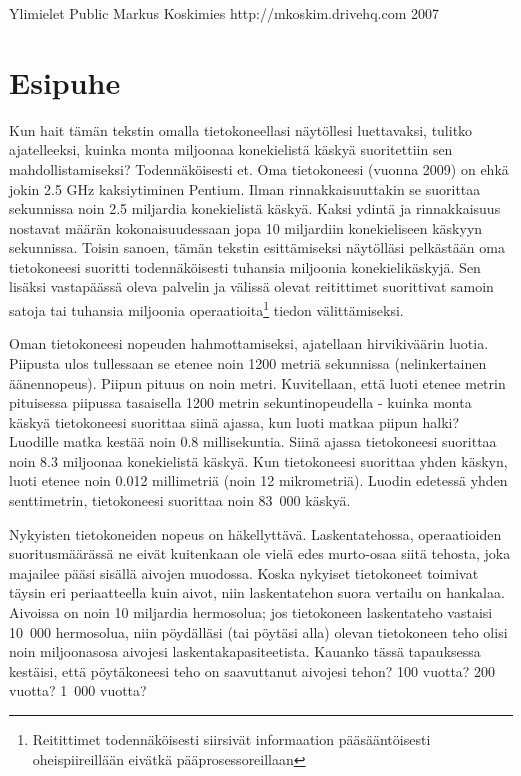 \longstory
{Ylimielet}
{}
{Public}
{Markus Koskimies}
{http://mkoskim.drivehq.com}
{2007}
\published
{}
{}\chapter{Esipuhe}Kun hait tämän tekstin omalla tietokoneellasi näytöllesi luettavaksi, tulitko ajatelleeksi, kuinka monta miljoonaa konekielistä käskyä suoritettiin sen mahdollistamiseksi? Todennäköisesti et. Oma tietokoneesi (vuonna 2009) on ehkä jokin 2.5 GHz kaksiytiminen Pentium. Ilman rinnakkaisuuttakin se suorittaa sekunnissa noin 2.5 miljardia konekielistä käskyä. Kaksi ydintä ja rinnakkaisuus nostavat määrän kokonaisuudessaan jopa 10 miljardiin konekieliseen käskyyn sekunnissa. Toisin sanoen, tämän tekstin esittämiseksi näytölläsi pelkästään oma tietokoneesi suoritti todennäköisesti tuhansia miljoonia konekielikäskyjä. Sen lisäksi vastapäässä oleva palvelin ja välissä olevat reitittimet suorittivat samoin satoja tai tuhansia miljoonia operaatioita\footnote{Reitittimet todennäköisesti siirsivät informaation pääsääntöisesti oheispiireillään eivätkä pääprosessoreillaan} tiedon välittämiseksi.


Oman tietokoneesi nopeuden hahmottamiseksi, ajatellaan hirvikiväärin luotia. Piipusta ulos tullessaan se etenee noin 1200 metriä sekunnissa (nelinkertainen äänennopeus). Piipun pituus on noin metri. Kuvitellaan, että luoti etenee metrin pituisessa piipussa tasaisella 1200 metrin sekuntinopeudella - kuinka monta käskyä tietokoneesi suorittaa siinä ajassa, kun luoti matkaa piipun halki? Luodille matka kestää noin 0.8 millisekuntia. Siinä ajassa tietokoneesi suorittaa noin 8.3 miljoonaa konekielistä käskyä. Kun tietokoneesi suorittaa yhden käskyn, luoti etenee noin 0.012 millimetriä (noin 12 mikrometriä). Luodin edetessä yhden senttimetrin, tietokoneesi suorittaa noin 83~000 käskyä.


Nykyisten tietokoneiden nopeus on häkellyttävä. Laskentatehossa, operaatioiden suoritusmäärässä ne eivät kuitenkaan ole vielä edes murto-osaa siitä tehosta, joka majailee pääsi sisällä aivojen muodossa. Koska nykyiset tietokoneet toimivat täysin eri periaatteella kuin aivot, niin laskentatehon suora vertailu on hankalaa. Aivoissa on noin 10 miljardia hermosolua; jos tietokoneen laskentateho vastaisi 10~000 hermosolua, niin pöydälläsi (tai pöytäsi alla) olevan tietokoneen teho olisi noin miljoonasosa aivojesi laskentakapasiteetista. Kauanko tässä tapauksessa kestäisi, että pöytäkoneesi teho on saavuttanut aivojesi tehon? 100 vuotta? 200 vuotta? 1~000 vuotta?


